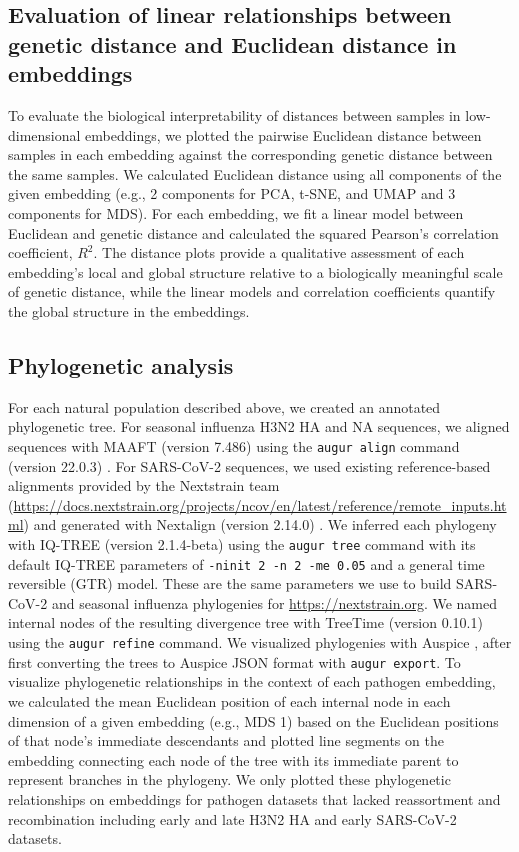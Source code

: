 \documentclass[webpdf,contemporary,large,single]{oup-authoring-template}%
\theoremstyle{thmstyleone}%
\theoremstyle{thmstyletwo}%
\theoremstyle{thmstylethree}%
\begin{document}
\subsection{Evaluation of linear relationships between genetic distance and Euclidean distance in embeddings}

To evaluate the biological interpretability of distances between samples in low-dimensional embeddings, we plotted the pairwise Euclidean distance between samples in each embedding against the corresponding genetic distance between the same samples.
We calculated Euclidean distance using all components of the given embedding (e.g., 2 components for PCA, t-SNE, and UMAP and 3 components for MDS).
For each embedding, we fit a linear model between Euclidean and genetic distance and calculated the squared Pearson's correlation coefficient, $R^{2}$.
The distance plots provide a qualitative assessment of each embedding's local and global structure relative to a biologically meaningful scale of genetic distance, while the linear models and correlation coefficients quantify the global structure in the embeddings.

\subsection{Phylogenetic analysis}

For each natural population described above, we created an annotated phylogenetic tree.
For seasonal influenza H3N2 HA and NA sequences, we aligned sequences with MAAFT (version 7.486) \citep{Katoh2002,Katoh2013} using the \texttt{augur align} command (version 22.0.3) \citep{Huddleston2021}.
For SARS-CoV-2 sequences, we used existing reference-based alignments provided by the Nextstrain team (\href{https://docs.nextstrain.org/projects/ncov/en/latest/reference/remote_inputs.html#summary-of-available-genbank-open-files}{https://docs.nextstrain.org/projects/ncov/en/latest/reference/remote\_inputs.html}) and generated with Nextalign (version 2.14.0) \citep{Aksamentov2021}.
We inferred each phylogeny with IQ-TREE (version 2.1.4-beta) \citep{Nguyen2014} using the \texttt{augur tree} command with its default IQ-TREE parameters of \texttt{-ninit 2 -n 2 -me 0.05} and a general time reversible (GTR) model.
These are the same parameters we use to build SARS-CoV-2 and seasonal influenza phylogenies for \href{nextstrain.org}{https://nextstrain.org}.
We named internal nodes of the resulting divergence tree with TreeTime (version 0.10.1) \citep{Sagulenko2018} using the \texttt{augur refine} command.
We visualized phylogenies with Auspice \citep{Hadfield2018}, after first converting the trees to Auspice JSON format with \texttt{augur export}.
To visualize phylogenetic relationships in the context of each pathogen embedding, we calculated the mean Euclidean position of each internal node in each dimension of a given embedding (e.g., MDS 1) based on the Euclidean positions of that node's immediate descendants and plotted line segments on the embedding connecting each node of the tree with its immediate parent to represent branches in the phylogeny.
We only plotted these phylogenetic relationships on embeddings for pathogen datasets that lacked reassortment and recombination including early and late H3N2 HA and early SARS-CoV-2 datasets.
\end{document}
